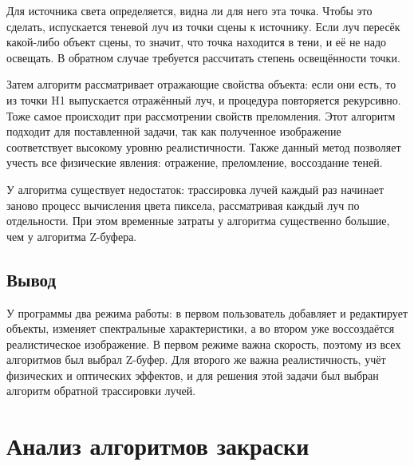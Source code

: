 Для источника света определяется, видна ли для него эта точка. 
Чтобы это сделать, испускается теневой луч из точки сцены к источнику. 
Если луч пересёк какой-либо объект сцены, то значит, что точка находится в тени, и её не надо освещать.
В обратном случае требуется рассчитать степень освещённости точки.

Затем алгоритм рассматривает отражающие свойства объекта: если они есть, то из точки H1 выпускается отражённый луч, и процедура повторяется рекурсивно. 
Тоже самое происходит при рассмотрении свойств преломления.
Этот алгоритм подходит для поставленной задачи, так как полученное изображение соответствует высокому уровню реалистичности.
Также данный метод позволяет учесть все физические явления: отражение, преломление, воссоздание теней. \cite{rojers}

У алгоритма существует недостаток: трассировка лучей каждый раз начинает заново процесс вычисления цвета пиксела, рассматривая каждый луч по отдельности. \cite{raytrac}
При этом временные затраты у алгоритма существенно большие, чем у алгоритма Z-буфера.

\subsection{Вывод}
У программы два режима работы: в первом пользователь добавляет и редактирует объекты, 
изменяет спектральные характеристики, а во втором уже воссоздаётся реалистическое изображение.
В первом режиме важна скорость, поэтому из всех алгоритмов был выбрал Z-буфер. 
Для второго же важна реалистичность, учёт физических и оптических эффектов, и для решения этой задачи был выбран алгоритм обратной трассировки лучей.

\section{Анализ алгоритмов закраски}

